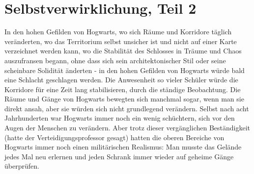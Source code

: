\chapter{Selbstverwirklichung, Teil 2}

In den hohen Gefilden von Hogwarts, wo sich Räume und Korridore täglich
veränderten, wo das Territorium selbst unsicher ist und nicht auf einer Karte
verzeichnet werden kann, wo die Stabilität des Schlosses in Träume und Chaos
auszufransen begann, ohne dass sich sein architektonischer Stil oder seine
scheinbare Solidität änderten - in den hohen Gefilden von Hogwarts würde bald
eine Schlacht geschlagen werden. Die Anwesenheit so vieler Schüler würde die
Korridore für eine Zeit lang stabilisieren, durch die ständige Beobachtung. Die
Räume und Gänge von Hogwarts bewegten sich manchmal sogar, wenn man sie direkt
ansah, aber sie würden sich nicht grundlegend verändern. Selbst nach acht
Jahrhunderten war Hogwarts immer noch ein wenig schüchtern, sich vor den Augen
der Menschen zu verändern. Aber trotz dieser vergänglichen Beständigkeit (hatte
der Verteidigungsprofessor gesagt) hatten die oberen Bereiche von Hogwarts immer
noch einen militärischen Realismus: Man musste das Gelände jedes Mal neu
erlernen und jeden Schrank immer wieder auf geheime Gänge überprüfen.

